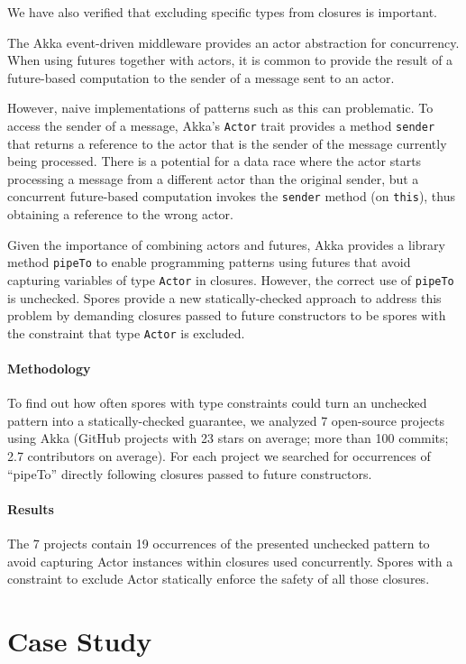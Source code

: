 \documentclass[runningheads]{llncs}
\begin{document}
\begin{sloppypar}
We have also verified that excluding specific types from closures is important.

The Akka event-driven middleware provides an actor abstraction for
concurrency. When using futures together with actors, it is common to provide
the result of a future-based computation to the sender of a message sent to an
actor.

However, naive implementations of patterns such as this can problematic. To
access the sender of a message, Akka's \verb|Actor| trait provides a method
\verb|sender| that returns a reference to the actor that is the sender of the
message currently being processed. There is a potential for a data race where
the actor starts processing a message from a different actor than the original
sender, but a concurrent future-based computation invokes the \verb|sender|
method (on \verb|this|), thus obtaining a reference to the wrong actor.

Given the importance of combining actors and futures, Akka provides a library
method \verb|pipeTo| to enable programming patterns using futures that avoid
capturing variables of type \verb|Actor| in closures. However, the correct use of
\verb|pipeTo| is unchecked. Spores provide a new statically-checked
approach to address this problem by demanding closures passed to future
constructors to be spores with the constraint that type \verb|Actor| is excluded.

\paragraph{\textbf{Methodology}} To find out how often spores with type
constraints could turn an unchecked pattern into a statically-checked
guarantee, we analyzed 7 open-source projects using Akka (GitHub projects
with 23 stars on average; more than 100 commits; 2.7 contributors on average).
For each project we searched for occurrences of ``pipeTo'' directly following
closures passed to future constructors.

\paragraph{\textbf{Results}} The 7 projects contain 19 occurrences of the
presented unchecked pattern to avoid capturing Actor instances within closures
used concurrently. Spores with a constraint to exclude Actor statically
enforce the safety of all those closures.


\section{Case Study}
\label{sec:case-studies}


\end{sloppypar}
\end{document}
